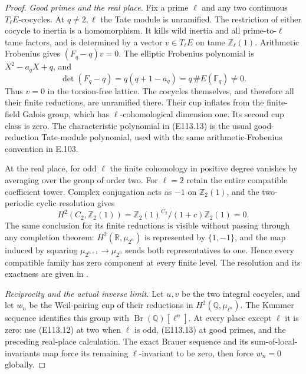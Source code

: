 \begin{proof}
\emph{Good primes and the real place.}
Fix a prime $\ell$ and any two continuous $T_\ell E$-cocycles.
At $q\ne2,\ell$ the Tate module is unramified.
The restriction of either cocycle to inertia is a homomorphism.
It kills wild inertia and all prime-to-$\ell$ tame factors,
and is determined by a vector $v\in T_\ell E$ on tame
$\mathbb Z_\ell(1)$.  Arithmetic Frobenius gives
$(F_q-q)v=0$.
The elliptic Frobenius polynomial is
$X^2-a_qX+q$, and
\[
 \det(F_q-q)=q(q+1-a_q)=q\,\#E(\mathbb F_q)\ne0.
 \tag{E113.13}
\]
Thus $v=0$ in the torsion-free lattice.  The cocycles themselves,
and therefore all their finite reductions, are unramified there.
Their cup inflates from the finite-field Galois group, which
has $\ell$-cohomological dimension one.  Its second cup class
is zero.  The characteristic polynomial in (E113.13) is the
usual good-reduction Tate-module polynomial, used with the
same arithmetic-Frobenius convention in E.103.

At the real place, for odd $\ell$ the finite cohomology in
positive degree vanishes by averaging over the group of order
two.  For $\ell=2$ retain the entire compatible coefficient
tower.  Complex conjugation acts as $-1$ on $\mathbb Z_2(1)$,
and the two-periodic cyclic resolution gives
\[
 H^2(C_2,\mathbb Z_2(1))
   =\mathbb Z_2(1)^{C_2}/(1+c)\mathbb Z_2(1)=0.
 \tag{E113.14}
\]
The same conclusion for its finite reductions is visible
without passing through any completion theorem:
$H^2(\mathbb R,\mu_{2^n})$ is represented by $\{1,-1\}$,
and the map induced by squaring
$\mu_{2^{n+1}}\to\mu_{2^n}$ sends both representatives to one.
Hence every compatible family has zero component at every
finite level.  The resolution and its exactness are given in
\cite[Chapter II, Proposition 3.4 and proof]{E_MilneCFT}.

\emph{Reciprocity and the actual inverse limit.}
Let $u,v$ be the two integral cocycles, and let $w_n$ be the
Weil-pairing cup of their reductions in
$H^2(\mathbb Q,\mu_{\ell^n})$.
The Kummer sequence identifies this group with
$\operatorname{Br}(\mathbb Q)[\ell^n]$.
At every place except $\ell$ it is zero: use (E113.12) at two
when $\ell$ is odd, (E113.13) at good primes, and the preceding
real-place calculation.  The exact Brauer sequence and its
sum-of-local-invariants map
\cite[Chapter VII, Theorems 7.1, 8.1; Chapter VIII, Theorem 4.2]{E_MilneCFT}
force its remaining $\ell$-invariant to be zero, then force
$w_n=0$ globally.


\end{proof}
